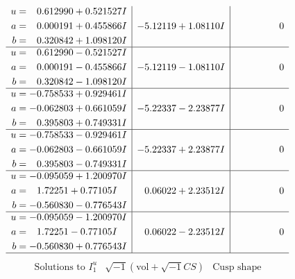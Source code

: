 \documentclass[1p]{elsarticle_modified}
\theoremstyle{definition}
\newcommand{\I}{\sqrt{-1}}
\begin{document}
$$\begin{array}{c|c|c}
\begin{aligned}
u &= \phantom{-}0.612990 + 0.521527 I \\
a &= \phantom{-}0.000191 + 0.455866 I \\
b &= \phantom{-}0.320842 + 1.098120 I\end{aligned}
 & -5.12119 + 1.08110 I & \phantom{-0.000000 } 0 \\ \hline\begin{aligned}
u &= \phantom{-}0.612990 - 0.521527 I \\
a &= \phantom{-}0.000191 - 0.455866 I \\
b &= \phantom{-}0.320842 - 1.098120 I\end{aligned}
 & -5.12119 - 1.08110 I & \phantom{-0.000000 } 0 \\ \hline\begin{aligned}
u &= -0.758533 + 0.929461 I \\
a &= -0.062803 + 0.661059 I \\
b &= \phantom{-}0.395803 + 0.749331 I\end{aligned}
 & -5.22337 - 2.23877 I & \phantom{-0.000000 } 0 \\ \hline\begin{aligned}
u &= -0.758533 - 0.929461 I \\
a &= -0.062803 - 0.661059 I \\
b &= \phantom{-}0.395803 - 0.749331 I\end{aligned}
 & -5.22337 + 2.23877 I & \phantom{-0.000000 } 0 \\ \hline\begin{aligned}
u &= -0.095059 + 1.200970 I \\
a &= \phantom{-}1.72251 + 0.77105 I \\
b &= -0.560830 - 0.776543 I\end{aligned}
 & \phantom{-}0.06022 + 2.23512 I & \phantom{-0.000000 } 0 \\ \hline\begin{aligned}
u &= -0.095059 - 1.200970 I \\
a &= \phantom{-}1.72251 - 0.77105 I \\
b &= -0.560830 + 0.776543 I\end{aligned}
 & \phantom{-}0.06022 - 2.23512 I & \phantom{-0.000000 } 0\\
 \hline 
 \end{array}$$\newpage$$\begin{array}{c|c|c}  
\text{Solutions to }I^u_{1}& \I (\text{vol} + \sqrt{-1}CS) & \text{Cusp shape}\\
 \hline 
\begin{aligned}

\end{aligned}
\end{array}$$
\end{document}
